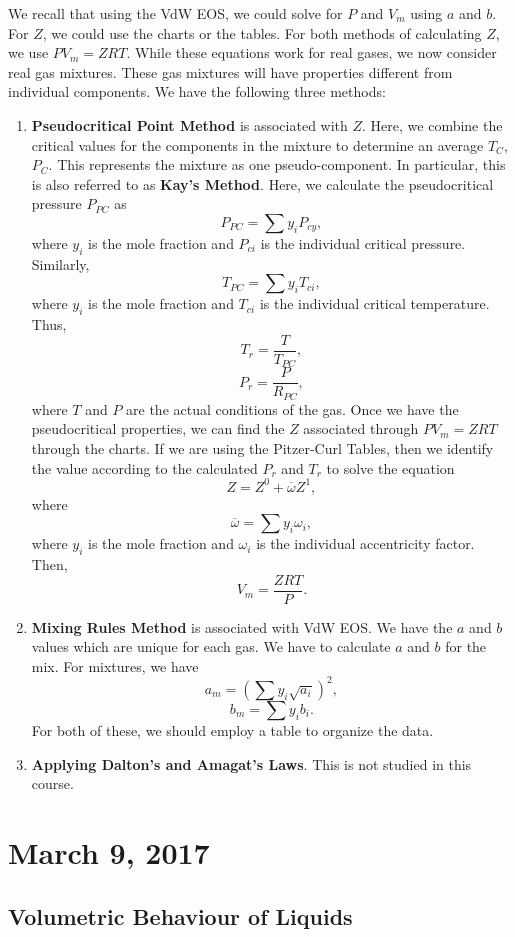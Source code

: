 \documentclass[11pt]{article}
\theoremstyle{plain} %
\theoremstyle{definition}
\theoremstyle{example}
\theoremstyle{remark}
\begin{document}
We recall that using the VdW EOS, we could solve for $P$ and $V_m$ using $a$ and $b$. For $Z$, we could use the charts or the tables. For both methods of calculating $Z$, we use $PV_m=ZRT$. While these equations work for real gases, we now consider real gas mixtures. These gas mixtures will have properties different from individual components. We have the following three methods: 
\begin{enumerate}
	\item \textbf{Pseudocritical Point Method} is associated with $Z$. Here, we combine the critical values for the components in the mixture to determine an average $T_C$, $P_C$. This represents the mixture as one pseudo-component. In particular, this is also referred to as \textbf{Kay's Method}. Here, we calculate the pseudocritical pressure $P_{PC}$ as 
	$$P_{PC} = \sum y_iP_{cy},$$
	where $y_i$ is the mole fraction and $P_{ci}$ is the individual critical pressure. Similarly,
	$$T_{PC} = \sum y_iT_{ci},$$
	where $y_i$ is the mole fraction and $T_{ci}$ is the individual critical temperature.  Thus,
	$$T_r = \frac{T}{T_{PC}},$$
	$$P_r = \frac{P}{R_{PC}},$$
	where $T$ and $P$ are the actual conditions of the gas. Once we have the pseudocritical properties, we can find the $Z$ associated through $PV_m = ZRT$ through the charts. If we are using the Pitzer-Curl Tables, then we identify the value according to the calculated $P_r$ and $T_r$ to solve the equation 
	$$Z = Z^0 + \overline{\omega}Z^1,$$
	where $$\overline{\omega} = \sum y_i\omega_i,$$
	where $y_i$ is the mole fraction and $\omega_i$ is the individual accentricity factor. Then,
	$$V_m = \frac{ZRT}{P}.$$
	
	\item \textbf{Mixing Rules Method} is associated with VdW EOS. We have the $a$ and $b$ values which are unique for each gas. We have to calculate $a$ and $b$ for the mix. For mixtures, we have 
	$$a_m =  \left(\sum y_i\sqrt{a_i}\right)^2,$$
	$$b_m = \sum y_ib_i.$$
	For both of these, we should employ a table to organize the data.
	\item \textbf{Applying Dalton's and Amagat's Laws}. This is not studied in this course. 
\end{enumerate}
	
	
\section{March 9, 2017}
\subsection{Volumetric Behaviour of Liquids}
\end{document}
